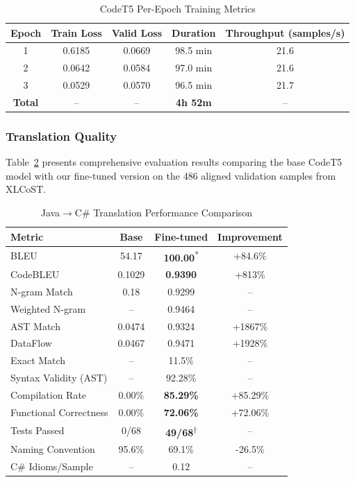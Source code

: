 \documentclass[conference]{IEEEtran}
\begin{document}
\begin{table}[htbp]
\caption{CodeT5 Per-Epoch Training Metrics}
\begin{center}
\begin{tabular}{|c|c|c|c|c|}
\hline
\textbf{Epoch} & \textbf{Train Loss} & \textbf{Valid Loss} & \textbf{Duration} & \textbf{Throughput (samples/s)} \\
\hline
1 & 0.6185 & 0.0669 & 98.5 min & 21.6 \\
2 & 0.0642 & 0.0584 & 97.0 min & 21.6 \\
3 & 0.0529 & 0.0570 & 96.5 min & 21.7 \\
\hline
\textbf{Total} & -- & -- & \textbf{4h 52m} & -- \\
\hline
\end{tabular}
\label{tab:codet5_epochs}
\end{center}
\end{table}

\subsubsection{Translation Quality}
Table~\ref{tab:codet5_results} presents comprehensive evaluation results comparing the base CodeT5 model with our fine-tuned version on the 486 aligned validation samples from XLCoST.

\begin{table}[htbp]
\caption{Java$\rightarrow$C\# Translation Performance Comparison}
\begin{center}
\begin{tabular}{|l|c|c|c|}
\hline
\textbf{Metric} & \textbf{Base} & \textbf{Fine-tuned} & \textbf{Improvement} \\
\hline
BLEU & 54.17 & \textbf{100.00}\textsuperscript{*} & +84.6\% \\
CodeBLEU & 0.1029 & \textbf{0.9390} & +813\% \\
\hspace{2mm}N-gram Match & 0.18 & 0.9299 & -- \\
\hspace{2mm}Weighted N-gram & -- & 0.9464 & -- \\
\hspace{2mm}AST Match & 0.0474 & 0.9324 & +1867\% \\
\hspace{2mm}DataFlow & 0.0467 & 0.9471 & +1928\% \\
\hline
Exact Match & -- & 11.5\% & -- \\
Syntax Validity (AST) & -- & 92.28\% & -- \\
Compilation Rate & 0.00\% & \textbf{85.29\%} & +85.29\% \\
Functional Correctness & 0.00\% & \textbf{72.06\%} & +72.06\% \\
Tests Passed & 0/68 & \textbf{49/68}\textsuperscript{$\dagger$} & -- \\
\hline
Naming Convention & 95.6\% & 69.1\% & -26.5\% \\
C\# Idioms/Sample & -- & 0.12 & -- \\
\hline
\end{tabular}
\label{tab:codet5_results}
\end{center}
\end{table}
\end{document}
